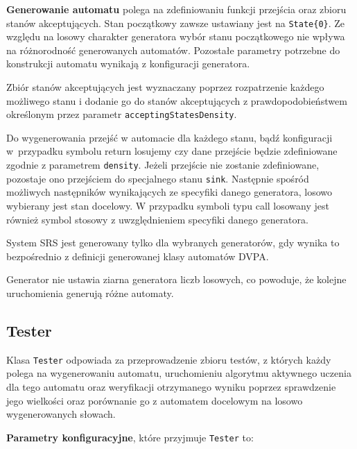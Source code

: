 \textbf{Generowanie automatu} polega na zdefiniowaniu funkcji przejścia oraz zbioru stanów akceptujących. Stan początkowy zawsze ustawiany
jest na \texttt{State\{0\}}. Ze względu na losowy charakter generatora wybór stanu początkowego nie wpływa na różnorodność generowanych automatów.
Pozostałe parametry potrzebne do konstrukcji automatu wynikają z konfiguracji generatora.

Zbiór stanów akceptujących jest wyznaczany poprzez rozpatrzenie każdego możliwego stanu i dodanie go do stanów akceptujących
z prawdopodobieństwem określonym przez parametr \texttt{acceptingStatesDensity}.

Do wygenerowania przejść w automacie dla każdego stanu, bądź konfiguracji w~przypadku symbolu return losujemy czy dane przejście
będzie zdefiniowane zgodnie z parametrem \texttt{density}. Jeżeli przejście nie zostanie zdefiniowane, pozostaje ono przejściem
do specjalnego stanu \texttt{sink}. Następnie spośród możliwych następników wynikających ze specyfiki danego generatora,
losowo wybierany jest stan docelowy. W przypadku symboli typu call losowany jest również symbol stosowy z uwzględnieniem specyfiki danego generatora.

System SRS jest generowany tylko dla wybranych generatorów, gdy wynika to bezpośrednio z definicji generowanej klasy automatów DVPA.

Generator nie ustawia ziarna generatora liczb losowych, co powoduje, że kolejne uruchomienia generują różne automaty.

\subsection{Tester}

Klasa \texttt{Tester} odpowiada za przeprowadzenie zbioru testów, z których każdy polega na wygenerowaniu automatu, uruchomieniu algorytmu
aktywnego uczenia dla tego automatu oraz weryfikacji otrzymanego wyniku poprzez sprawdzenie jego wielkości oraz porównanie go z automatem
docelowym na losowo wygenerowanych słowach.

\textbf{Parametry konfiguracyjne}, które przyjmuje \texttt{Tester} to:

